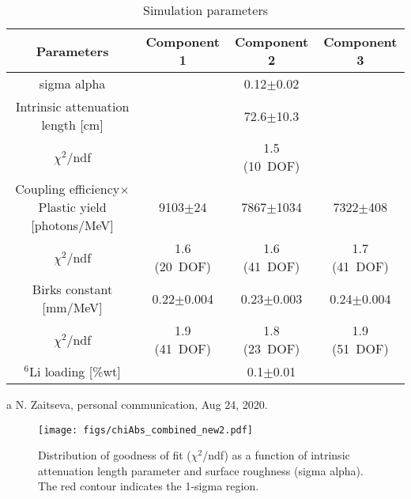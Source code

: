 \documentclass[final,5p,times,twocolumn]{elsarticle}
\begin{document}
\begin{table*}[ht!]
\centering
 \begin{threeparttable}
\caption{Simulation parameters} 
\label{tab_param}
\centering
\begin{tabular}{|c||c c c| }
\hline
Parameters & Component 1 & Component 2 & Component 3 \\
\hline
\hline
sigma alpha   & & 0.12$\pm$0.02 & \\
Intrinsic attenuation length [cm] & & 72.6$\pm$10.3 & \\
$\chi^2$/ndf                      & & 1.5 (10~DOF)  & \\
\hline
\hline
Coupling efficiency$\times$Plastic yield [photons/MeV] &9103$\pm$24 &7867$\pm$1034 &7322$\pm$408 \\
$\chi^2$/ndf            &1.6 (20~DOF)    &1.6 (41~DOF)    &1.7 (41~DOF)          \\
\hline
\hline
Birks constant [mm/MeV] &0.22$\pm$0.004 &0.23$\pm$0.003 &0.24$\pm$0.004 \\
$\chi^2$/ndf            &1.9 (41~DOF)   &1.8 (23~DOF)   &1.9 (51~DOF)           \\
\hline
\hline
$^6$Li loading [\%wt] & &  0.1$\pm$0.01\tnote{a}   & \\
\hline
\end{tabular}
\begin{tablenotes}
      \item[a]{N. Zaitseva, personal communication, Aug 24, 2020.}
    \end{tablenotes}
\end{threeparttable}
\end{table*}

\begin{figure}[ht]
\centering\texttt{[image: figs/chiAbs\_combined\_new2.pdf]}
\vspace{-0.3cm}
\caption{Distribution of goodness of fit ($\chi^2$/ndf) as a function of intrinsic attenuation length parameter and surface roughness (sigma alpha). The red contour indicates the 1-sigma region.}
\label{fig_chiAbs}
\end{figure}

%
%
\end{document}
